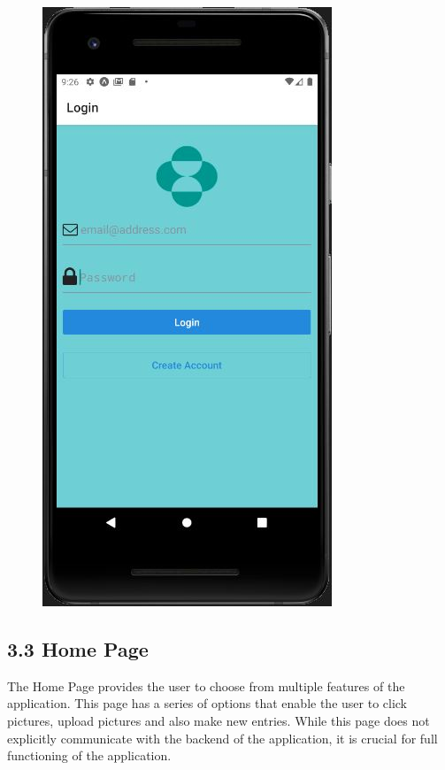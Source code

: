 \documentclass[]{book}
\begin{document}
\begin{figure}
\centering
\includegraphics{./phone_app_doc_images/login_page.JPG}
\caption{}
\end{figure}

\subsection{3.3 Home Page}\label{home-page}

The Home Page provides the user to choose from multiple features of the
application. This page has a series of options that enable the user to
click pictures, upload pictures and also make new entries. While this
page does not explicitly communicate with the backend of the
application, it is crucial for full functioning of the application.
\end{document}
